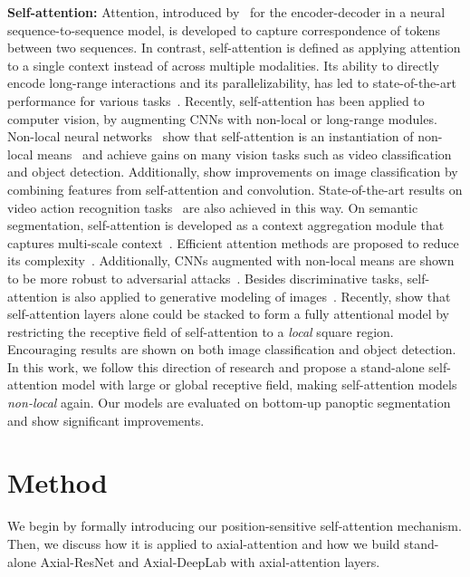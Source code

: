 \documentclass[runningheads]{llncs}
\begin{document}
{\bf Self-attention:} Attention, introduced by~\cite{bahdanau2014neural} for the encoder-decoder in a neural sequence-to-sequence model, is developed to capture correspondence of tokens between two sequences. In contrast, self-attention is defined as applying attention to a single context instead of across multiple modalities. Its ability to directly encode long-range interactions and its parallelizability, has led to state-of-the-art performance for various tasks~\cite{vaswani2017attention,huang2019music,devlin2018bert,parmar2018image,shaw2018self,dai2019transformer,li2020neural}. Recently, self-attention has been applied to computer vision, by augmenting CNNs with non-local or long-range modules. Non-local neural networks~\cite{wang2018non} show that self-attention is an instantiation of non-local means~\cite{buades2005non} and achieve gains on many vision tasks such as video classification and object detection. Additionally, \cite{chen20182,bello2019attention} show improvements on image classification by combining features from self-attention and convolution. State-of-the-art results on video action recognition tasks~\cite{chen20182} are also achieved in this way. On semantic segmentation, self-attention is developed as a context aggregation module that captures multi-scale context~\cite{huang2019ccnet,fu2019dual,zhu2019asymmetric,zhu2019empirical}. Efficient attention methods are proposed to reduce its complexity~\cite{shen2018efficient,huang2019ccnet,li2020neural}. Additionally, CNNs augmented with non-local means \cite{buades2005non} are shown to be more robust to adversarial attacks~\cite{xie2019feature}. Besides discriminative tasks, self-attention is also applied to generative modeling of images~\cite{zhang2018self,brock2019large,ho2019axial}.
Recently, \cite{parmar2019stand,hu2019local} show that self-attention layers alone could be stacked to form a fully attentional model by restricting the receptive field of self-attention to a {\it local} square region. Encouraging results are shown on both image classification and object detection. In this work, we follow this direction of research and propose a stand-alone self-attention model with large or global receptive field, making self-attention models {\it non-local} again. Our models are evaluated on bottom-up panoptic segmentation and show significant improvements. \section{Method}
\label{sec:model}
We begin by formally introducing our position-sensitive self-attention mechanism. Then, we discuss how it is applied to axial-attention and how we build stand-alone Axial-ResNet and Axial-DeepLab with axial-attention layers.
\end{document}
